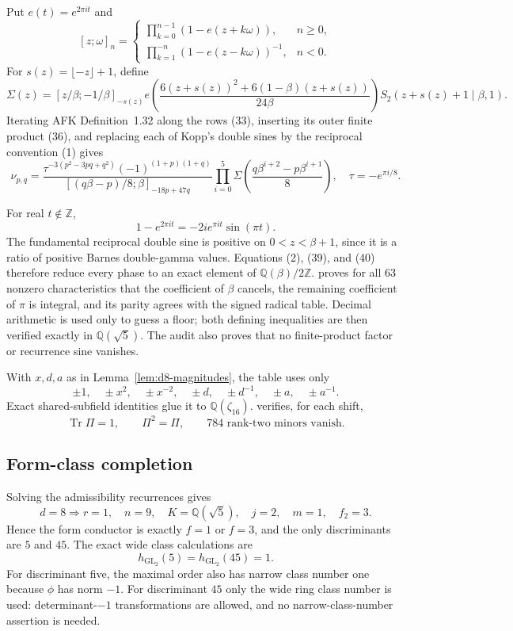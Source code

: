 \documentclass[11pt]{article}
\newcommand{\Tr}{\operatorname{Tr}}
\newcommand{\Q}{\mathbb Q}
\newcommand{\Z}{\mathbb Z}
\begin{document}
Put $e(t)=e^{2\pi i t}$ and
\[
 [z;\omega]_n=
 \begin{cases}
 \prod_{k=0}^{n-1}(1-e(z+k\omega)),&n\geq0,\\
 \prod_{k=1}^{-n}(1-e(z-k\omega))^{-1},&n<0.
 \end{cases}
\tag{37}
\]
For $s(z)=\lfloor-z\rfloor+1$, define
\[
 \Sigma(z)=[z/\beta;-1/\beta]_{-s(z)}
 e\!\left(
 \frac{6(z+s(z))^2+6(1-\beta)(z+s(z))}
 {24\beta}\right)
 S_2(z+s(z)+1\mid\beta,1).
\tag{38}
\]
Iterating AFK Definition~1.32 along the rows \textup{(33)}, inserting
its outer finite product \textup{(36)}, and replacing each of Kopp's
double sines by the reciprocal convention \textup{(1)} gives
\[
 \nu_{p,q}=
 \frac{\tau^{-3(p^2-3pq+q^2)}(-1)^{(1+p)(1+q)}}
 {[(q\beta-p)/8;\beta]_{-18p+47q}}
 \prod_{i=0}^{5}
 \Sigma\!\left(\frac{q\beta^{i+2}-p\beta^{i+1}}8\right),
 \quad \tau=-e^{\pi i/8}.
\tag{39}
\]

For real $t\notin\Z$,
\[
 1-e^{2\pi i t}=-2i e^{\pi i t}\sin(\pi t).
\tag{40}
\]
The fundamental reciprocal double sine is positive on
$0<z<\beta+1$, since it is a ratio of positive Barnes double-gamma
values.  Equations
\textup{(2)}, \textup{(39)}, and \textup{(40)} therefore reduce every
phase to an exact element of $\Q(\beta)/2\Z$.
 proves for all
$63$ nonzero characteristics that the coefficient of $\beta$ cancels,
the remaining coefficient of $\pi$ is integral, and its parity agrees
with the signed radical table.  Decimal arithmetic is used only to
guess a floor; both defining inequalities are then verified exactly in
$\Q(\sqrt5)$.  The audit also proves that no finite-product factor or
recurrence sine vanishes.

With $x,d,a$ as in Lemma~\ref{lem:d8-magnitudes},
the table uses only
\[
 \pm1,\quad\pm x^2,\quad\pm x^{-2},\quad
 \pm d,\quad\pm d^{-1},\quad\pm a,\quad\pm a^{-1}.
\tag{41}
\]
Exact shared-subfield identities glue it to $\Q(\zeta_{16})$.
 verifies, for
each shift,
\[
 \Tr\Pi=1,\qquad \Pi^2=\Pi,\qquad
 784\text{ rank-two minors vanish}.
\tag{42}
\]

\subsection{Form-class completion}

Solving the admissibility recurrences gives
\[
 d=8\Longrightarrow
 r=1,\quad n=9,\quad K=\Q(\sqrt5),\quad
 j=2,\quad m=1,\quad f_2=3.
\tag{43}
\]
Hence the form conductor is exactly $f=1$ or $f=3$, and the only
discriminants are $5$ and $45$.  The exact wide class calculations are
\[
 h_{\mathrm{GL}_2}(5)=h_{\mathrm{GL}_2}(45)=1.
\tag{44}
\]
For discriminant five, the maximal order also has narrow class number
one because $\phi$ has norm $-1$.  For discriminant $45$ only the wide
ring class number is used: determinant-$-1$ transformations are
allowed, and no narrow-class-number assertion is needed.
\end{document}
